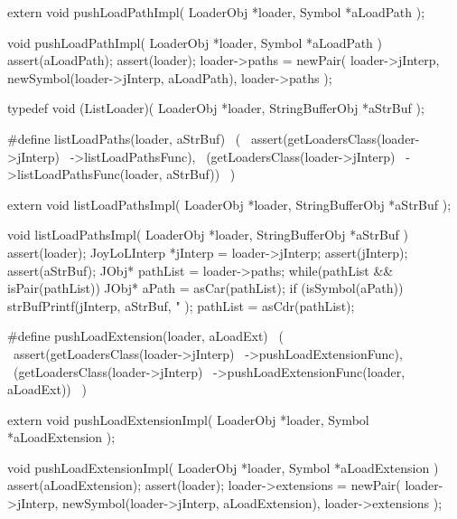 \startCHeader
extern void pushLoadPathImpl(
  LoaderObj *loader,
  Symbol    *aLoadPath
);
\stopCHeader
{}

\startCCode
void pushLoadPathImpl(
  LoaderObj *loader,
  Symbol    *aLoadPath
) {
  assert(aLoadPath);
  assert(loader);
  loader->paths =
    newPair(
      loader->jInterp,
      newSymbol(loader->jInterp, aLoadPath),
      loader->paths
    );
}
\stopCCode

\startCHeader
typedef void (ListLoader)(
  LoaderObj       *loader,
  StringBufferObj *aStrBuf
);

#define listLoadPaths(loader, aStrBuf)      \
  (                                         \
    assert(getLoadersClass(loader->jInterp) \
      ->listLoadPathsFunc),                 \
    (getLoadersClass(loader->jInterp)       \
      ->listLoadPathsFunc(loader, aStrBuf)) \
  )
\stopCHeader

\setCHeaderStream{private}
\startCHeader
extern void listLoadPathsImpl(
  LoaderObj       *loader,
  StringBufferObj *aStrBuf
);
\stopCHeader
{}

\startCCode
void listLoadPathsImpl(
  LoaderObj       *loader,
  StringBufferObj *aStrBuf
) {
  assert(loader);
  JoyLoLInterp *jInterp = loader->jInterp;
  assert(jInterp);
  assert(aStrBuf);
  JObj* pathList = loader->paths;
  while(pathList && isPair(pathList)) {
    JObj* aPath = asCar(pathList);
    if (isSymbol(aPath)) {
      strBufPrintf(jInterp, aStrBuf,
        "%
      );
    }
    pathList = asCdr(pathList);
  }  
}
\stopCCode

\startCHeader
#define pushLoadExtension(loader, aLoadExt)       \
  (                                               \
    assert(getLoadersClass(loader->jInterp)       \
      ->pushLoadExtensionFunc),                   \
    (getLoadersClass(loader->jInterp)             \
      ->pushLoadExtensionFunc(loader, aLoadExt))  \
  )
\stopCHeader

\startCHeader
extern void pushLoadExtensionImpl(
  LoaderObj *loader,
  Symbol    *aLoadExtension
);
\stopCHeader
\setCHeaderStream{public}

\startCCode
void pushLoadExtensionImpl(
  LoaderObj *loader,
  Symbol    *aLoadExtension
) {
  assert(aLoadExtension);
  assert(loader);
  loader->extensions =
    newPair(
      loader->jInterp, 
      newSymbol(loader->jInterp, aLoadExtension),
      loader->extensions
    );
}
\stopCCode

